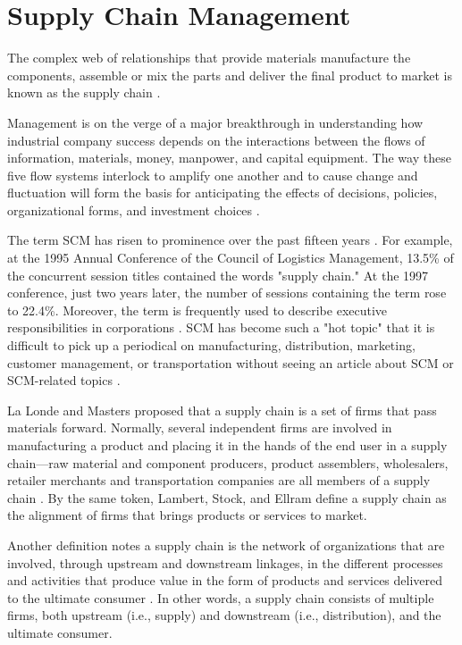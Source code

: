 \section{Supply Chain Management}\label{sec:scm}

The complex web of relationships that provide materials manufacture the components, assemble or mix the parts and deliver the final product to market is known as the supply chain \cite{buurman2002supply}.

Management is on the verge of a major breakthrough in understanding how industrial company success depends on the interactions between the flows of information, materials, money, manpower, and capital equipment. The way these five flow systems interlock to amplify one another and to cause change and fluctuation will form the basis for anticipating the effects of decisions, policies, organizational forms, and investment choices \cite{forrester1958industrial}.

The term \ac{SCM} has risen to prominence over the past fifteen years \cite{cooper1997supply}. For example, at the 1995 Annual Conference of the Council of Logistics Management, 13.5\% of the concurrent session titles contained the words "supply chain." At the 1997 conference, just two years later, the number of sessions containing the term rose to 22.4\%. Moreover, the term is frequently used to describe executive responsibilities in corporations \cite{la1997supply}. SCM has become such a "hot topic" that it is difficult to pick up a periodical on manufacturing, distribution, marketing, customer management, or transportation without seeing an article about SCM or SCM-related topics \cite{ross1997competing}.

La Londe and Masters proposed that a supply chain is a set of firms that pass materials forward. Normally, several independent firms are involved in manufacturing a product and placing it in the hands of the end user in a supply chain—raw material and component producers, product assemblers, wholesalers, retailer merchants and transportation companies are all members of a supply chain \cite{la1994emerging}. By the same token, Lambert, Stock, and Ellram define a supply chain as the alignment of firms that brings products or services to market. 

Another definition notes a supply chain is the network of organizations that are involved, through upstream and downstream linkages, in the different processes and activities that produce value in the form of products and services delivered to the ultimate consumer \cite{christopher2017logistics}. In other words, a supply chain consists of multiple firms, both upstream (i.e., supply) and downstream
(i.e., distribution), and the ultimate consumer. 

